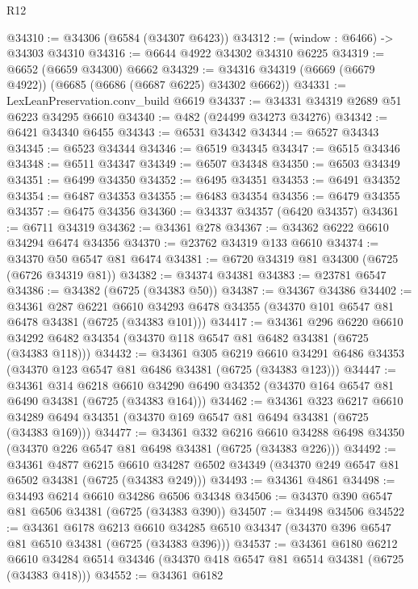 \begin{lexlean}{R12}
\begin{coremodule}
@34310 := @34306 (@6584 (@34307 @6423))
@34312 := (window : @6466) -> @34303 @34310
@34316 := @6644 @4922 @34302 @34310 @6225
@34319 := @6652 (@6659 @34300) @6662
@34329 := @34316 @34319 (@6669 (@6679 @4922)) (@6685 (@6686 (@6687 @6225) @34302 @6662))
@34331 := LexLeanPreservation.conv_build @6619
@34337 := @34331 @34319 @2689 @51 @6223 @34295 @6610
@34340 := @482 (@24499 @34273 @34276)
@34342 := @6421 @34340 @6455
@34343 := @6531 @34342
@34344 := @6527 @34343
@34345 := @6523 @34344
@34346 := @6519 @34345
@34347 := @6515 @34346
@34348 := @6511 @34347
@34349 := @6507 @34348
@34350 := @6503 @34349
@34351 := @6499 @34350
@34352 := @6495 @34351
@34353 := @6491 @34352
@34354 := @6487 @34353
@34355 := @6483 @34354
@34356 := @6479 @34355
@34357 := @6475 @34356
@34360 := @34337 @34357 (@6420 @34357)
@34361 := @6711 @34319
@34362 := @34361 @278
@34367 := @34362 @6222 @6610 @34294 @6474 @34356
@34370 := @23762 @34319 @133 @6610
@34374 := @34370 @50 @6547 @81 @6474
@34381 := @6720 @34319 @81 @34300 (@6725 (@6726 @34319 @81))
@34382 := @34374 @34381
@34383 := @23781 @6547
@34386 := @34382 (@6725 (@34383 @50))
@34387 := @34367 @34386
@34402 := @34361
    @287
    @6221
    @6610
    @34293
    @6478
    @34355
    (@34370 @101 @6547 @81 @6478 @34381 (@6725 (@34383 @101)))
@34417 := @34361
    @296
    @6220
    @6610
    @34292
    @6482
    @34354
    (@34370 @118 @6547 @81 @6482 @34381 (@6725 (@34383 @118)))
@34432 := @34361
    @305
    @6219
    @6610
    @34291
    @6486
    @34353
    (@34370 @123 @6547 @81 @6486 @34381 (@6725 (@34383 @123)))
@34447 := @34361
    @314
    @6218
    @6610
    @34290
    @6490
    @34352
    (@34370 @164 @6547 @81 @6490 @34381 (@6725 (@34383 @164)))
@34462 := @34361
    @323
    @6217
    @6610
    @34289
    @6494
    @34351
    (@34370 @169 @6547 @81 @6494 @34381 (@6725 (@34383 @169)))
@34477 := @34361
    @332
    @6216
    @6610
    @34288
    @6498
    @34350
    (@34370 @226 @6547 @81 @6498 @34381 (@6725 (@34383 @226)))
@34492 := @34361
    @4877
    @6215
    @6610
    @34287
    @6502
    @34349
    (@34370 @249 @6547 @81 @6502 @34381 (@6725 (@34383 @249)))
@34493 := @34361 @4861
@34498 := @34493 @6214 @6610 @34286 @6506 @34348
@34506 := @34370 @390 @6547 @81 @6506 @34381 (@6725 (@34383 @390))
@34507 := @34498 @34506
@34522 := @34361
    @6178
    @6213
    @6610
    @34285
    @6510
    @34347
    (@34370 @396 @6547 @81 @6510 @34381 (@6725 (@34383 @396)))
@34537 := @34361
    @6180
    @6212
    @6610
    @34284
    @6514
    @34346
    (@34370 @418 @6547 @81 @6514 @34381 (@6725 (@34383 @418)))
@34552 := @34361
    @6182

\end{coremodule}
\end{lexlean}
